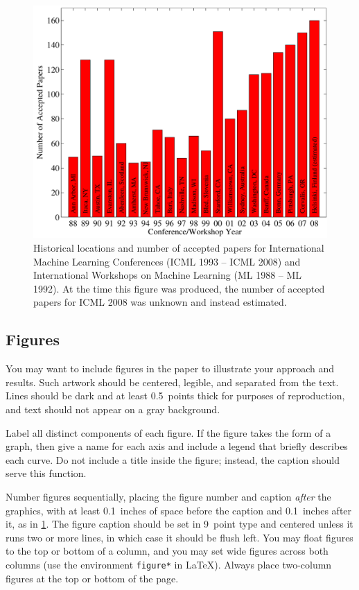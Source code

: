 \documentclass{article}
\theoremstyle{plain}
\theoremstyle{definition}
\theoremstyle{remark}
\begin{document}
\begin{figure}[ht]
\vskip 0.2in
\begin{center}
\centerline{\includegraphics[width=\columnwidth]{icml_numpapers}}
\caption{Historical locations and number of accepted papers for International
Machine Learning Conferences (ICML 1993 -- ICML 2008) and International
Workshops on Machine Learning (ML 1988 -- ML 1992). At the time this figure was
produced, the number of accepted papers for ICML 2008 was unknown and instead
estimated.}
\label{icml-historical}
\end{center}
\vskip -0.2in
\end{figure}

\subsection{Figures}

You may want to include figures in the paper to illustrate
your approach and results. Such artwork should be centered,
legible, and separated from the text. Lines should be dark and at
least 0.5~points thick for purposes of reproduction, and text should
not appear on a gray background.

Label all distinct components of each figure. If the figure takes the
form of a graph, then give a name for each axis and include a legend
that briefly describes each curve. Do not include a title inside the
figure; instead, the caption should serve this function.

Number figures sequentially, placing the figure number and caption
\emph{after} the graphics, with at least 0.1~inches of space before
the caption and 0.1~inches after it, as in
\cref{icml-historical}. The figure caption should be set in
9~point type and centered unless it runs two or more lines, in which
case it should be flush left. You may float figures to the top or
bottom of a column, and you may set wide figures across both columns
(use the environment \texttt{figure*} in \LaTeX). Always place
two-column figures at the top or bottom of the page.
\end{document}
